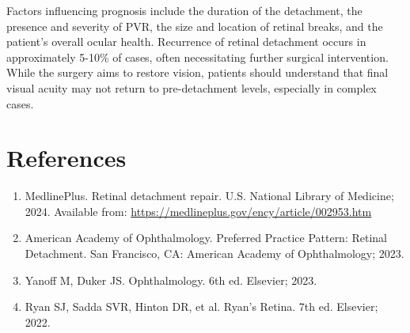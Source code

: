 Factors influencing prognosis include the duration of the detachment, the presence and severity of PVR, the size and location of retinal breaks, and the patient's overall ocular health. Recurrence of retinal detachment occurs in approximately 5-10\% of cases, often necessitating further surgical intervention. While the surgery aims to restore vision, patients should understand that final visual acuity may not return to pre-detachment levels, especially in complex cases.

\section*{References}
\begin{enumerate}
  \item MedlinePlus. Retinal detachment repair. U.S. National Library of Medicine; 2024. Available from: \url{https://medlineplus.gov/ency/article/002953.htm}
  
  \item American Academy of Ophthalmology. Preferred Practice Pattern: Retinal Detachment. San Francisco, CA: American Academy of Ophthalmology; 2023.
  
  \item Yanoff M, Duker JS. Ophthalmology. 6th ed. Elsevier; 2023.
  
  \item Ryan SJ, Sadda SVR, Hinton DR, et al. Ryan's Retina. 7th ed. Elsevier; 2022.
\end{enumerate}

\clearpage
